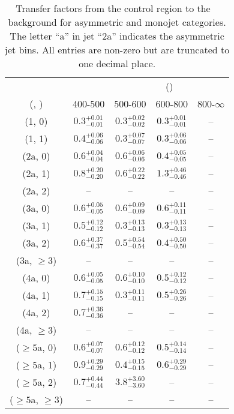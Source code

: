 \begin{table}[h!]
\tiny
\centering
\caption{Transfer factors from the \gj control region to the \zInv~ background for asymmetric and monojet categories. The letter ``a'' in jet \eg ``2a''  indicates the asymmetric jet bins. All entries are non-zero but are truncated to one decimal place.\label{tab:tf_gj_zinv_asym}}
\begin{tabular}
{ccccc}
	\hline\hline
&	& \multicolumn{4}{c}{\scalht (\gev)} \\ 
	 (\njet,  \nb) & 400-500 & 500-600 & 600-800 & 800-$\infty$ \\ [0.8ex] 
\hline
	(1, 0) & $0.3^{+ 0.01 }_{- 0.01 }$ & $0.3^{+ 0.02 }_{- 0.02 }$ & $0.3^{+ 0.01 }_{- 0.01 }$ & -- \\[0.5ex] 
	(1, 1) & $0.4^{+ 0.06 }_{- 0.06 }$ & $0.3^{+ 0.07 }_{- 0.07 }$ & $0.3^{+ 0.06 }_{- 0.06 }$ & -- \\[0.5ex] 
	(2a, 0) & $0.6^{+ 0.04 }_{- 0.04 }$ & $0.6^{+ 0.06 }_{- 0.06 }$ & $0.4^{+ 0.05 }_{- 0.05 }$ & -- \\[0.5ex] 
	(2a, 1) & $0.8^{+ 0.20 }_{- 0.20 }$ & $0.6^{+ 0.22 }_{- 0.22 }$ & $1.3^{+ 0.46 }_{- 0.46 }$ & -- \\[0.5ex] 
	(2a, 2) & -- & -- & -- & -- \\[0.5ex] 
	(3a, 0) & $0.6^{+ 0.05 }_{- 0.05 }$ & $0.6^{+ 0.09 }_{- 0.09 }$ & $0.6^{+ 0.11 }_{- 0.11 }$ & -- \\[0.5ex] 
	(3a, 1) & $0.5^{+ 0.12 }_{- 0.12 }$ & $0.3^{+ 0.13 }_{- 0.13 }$ & $0.3^{+ 0.13 }_{- 0.13 }$ & -- \\[0.5ex] 
	(3a, 2) & $0.6^{+ 0.37 }_{- 0.37 }$ & $0.5^{+ 0.54 }_{- 0.54 }$ & $0.4^{+ 0.50 }_{- 0.50 }$ & -- \\[0.5ex] 
	(3a, $\ge3$) & -- & -- & -- & -- \\[0.5ex] 
	(4a, 0) & $0.6^{+ 0.05 }_{- 0.05 }$ & $0.6^{+ 0.10 }_{- 0.10 }$ & $0.5^{+ 0.12 }_{- 0.12 }$ & -- \\[0.5ex] 
	(4a, 1) & $0.7^{+ 0.15 }_{- 0.15 }$ & $0.3^{+ 0.11 }_{- 0.11 }$ & $0.5^{+ 0.26 }_{- 0.26 }$ & -- \\[0.5ex] 
	(4a, 2) & $0.7^{+ 0.36 }_{- 0.36 }$ & -- & -- & -- \\[0.5ex] 
	(4a, $\ge3$) & -- & -- & -- & -- \\[0.5ex] 
	($\ge5$a, 0) & $0.6^{+ 0.07 }_{- 0.07 }$ & $0.6^{+ 0.12 }_{- 0.12 }$ & $0.5^{+ 0.14 }_{- 0.14 }$ & -- \\[0.5ex] 
	($\ge5$a, 1) & $0.9^{+ 0.29 }_{- 0.29 }$ & $0.4^{+ 0.15 }_{- 0.15 }$ & $0.6^{+ 0.29 }_{- 0.29 }$ & -- \\[0.5ex] 
	($\ge5$a, 2) & $0.7^{+ 0.44 }_{- 0.44 }$ & $3.8^{+ 3.60 }_{- 3.60 }$ & -- & -- \\[0.5ex] 
	($\ge5$a, $\ge3$) & -- & -- & -- & -- \\[0.5ex] 
	\hline
	\hline
\end{tabular}
\end{table}

